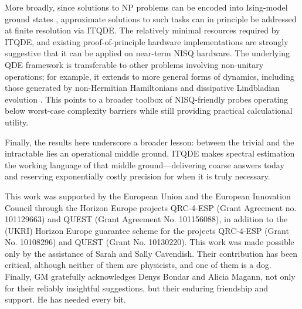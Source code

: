 \documentclass[reprint, aps,prx,showpacs,bibfootnote,preprintnumbers, mathtools, superscriptaddress, amsmath,amssymb]{revtex4-2}
\begin{document}
More broadly, since solutions to NP problems can be encoded into Ising-model ground states \cite{lucas_ising_2014}, approximate solutions to such tasks can in principle be addressed at finite resolution via ITQDE. The relatively minimal resources required by ITQDE, and existing proof-of-principle hardware implementations \cite{leamer_quantum_2024} are strongly suggestive that it can be applied on near-term NISQ hardware. The underlying QDE framework is transferable to other problems involving non-unitary operations; for example, it extends to more general forms of dynamics, including those generated by non-Hermitian Hamiltonians \cite{ivaki_dynamical_2025} and dissipative Lindbladian evolution \cite{McCaulensemble}. This points to a broader toolbox of NISQ-friendly probes operating below worst-case complexity barriers while still providing practical calculational utility.

Finally, the results here underscore a broader lesson: between the trivial and the intractable lies an operational middle ground. ITQDE makes spectral estimation the working language of that middle ground—delivering coarse answers today and reserving exponentially costly precision for when it is truly necessary.





 \begin{acknowledgments}
 This work was supported by the European Union and the European Innovation Council through the Horizon Europe projects QRC-4-ESP (Grant Agreement no. 101129663) and QUEST (Grant Agreement No. 101156088), in addition to the (UKRI) Horizon Europe guarantee scheme for the projects QRC-4-ESP  (Grant No. 10108296) and QUEST (Grant No. 10130220).  This work was made possible only by the assistance of Sarah and Sally Cavendish. Their contribution has been critical, although neither of them are physicists, and one of them is a dog. Finally, GM gratefully acknowledges Denys Bondar and Alicia Magann, not only for their reliably insightful suggestions, but their enduring friendship and support. He has needed every bit.
\end{acknowledgments}

\appendix
\end{document}
